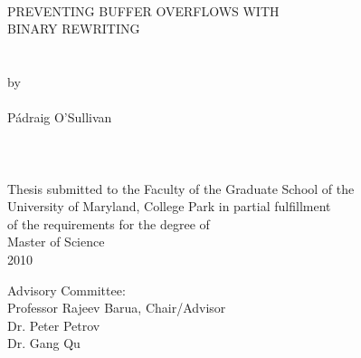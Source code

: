 
\thispagestyle{empty}
\hbox{\ }
\vspace{1in}
\renewcommand{\baselinestretch}{1}
\small\normalsize
\begin{center}

\large{{PREVENTING BUFFER OVERFLOWS WITH\\
BINARY REWRITING}}\\
\ \\
\ \\
\large{by} \\
\ \\
\large{P\'{a}draig O'Sullivan}%
\ \\
\ \\
\ \\
\ \\
\normalsize
Thesis submitted to the Faculty of the Graduate School of the \\
University of Maryland, College Park in partial fulfillment \\
of the requirements for the degree of \\
Master of Science \\
2010
\end{center}

\vspace{7.5em}

\noindent Advisory Committee: \\
Professor Rajeev Barua, Chair/Advisor \\
Dr. Peter Petrov \\
Dr. Gang Qu
